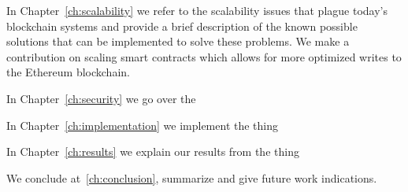 In Chapter~\ref{ch:scalability} we refer to the scalability issues that plague today's blockchain systems and provide a brief description of the known possible solutions that can be implemented to solve these problems. We make a contribution on scaling smart contracts which allows for more optimized writes to the Ethereum blockchain.

In Chapter~\ref{ch:security} we go over the 

In Chapter~\ref{ch:implementation} we implement the thing

In Chapter~\ref{ch:results} we explain our results from the thing

We conclude at~\ref{ch:conclusion}, summarize and give future work indications. 